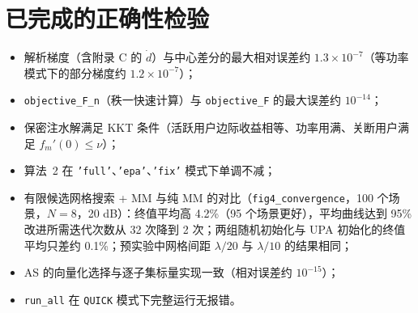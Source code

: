 \documentclass[11pt,a4paper]{ctexart}
\newcommand{\code}[1]{\texttt{#1}}
\begin{document}
\section{已完成的正确性检验}
\begin{itemize}
\item 解析梯度（含附录 C 的 $\dot d$）与中心差分的最大相对误差约 $1.3\times10^{-7}$（等功率模式下的部分梯度约 $1.2\times10^{-7}$）；
\item \code{objective\_F\_n}（秩一快速计算）与 \code{objective\_F} 的最大误差约 $10^{-14}$；
\item 保密注水解满足 KKT 条件（活跃用户边际收益相等、功率用满、关断用户满足 $f_m'(0)\le\nu$）；
\item 算法~2 在 \code{'full'}、\code{'epa'}、\code{'fix'} 模式下单调不减；
\item 有限候选网格搜索 + MM 与纯 MM 的对比（\code{fig4\_convergence}，100 个场景，$N=8$，20 dB）：终值平均高 4.2\%（95 个场景更好），平均曲线达到 95\% 改进所需迭代次数从 32 次降到 2 次；两组随机初始化与 UPA 初始化的终值平均只差约 0.1\%；预实验中网格间距 $\lambda/20$ 与 $\lambda/10$ 的结果相同；
\item AS 的向量化选择与逐子集标量实现一致（相对误差约 $10^{-15}$）；
\item \code{run\_all} 在 \code{QUICK} 模式下完整运行无报错。
\end{itemize}
\end{document}
